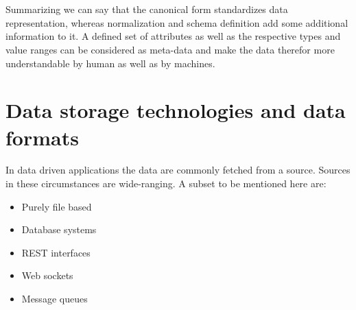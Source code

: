 \\\\
Summarizing we can say that the canonical form standardizes data representation, whereas normalization and schema definition add some additional information to it. A defined set of attributes as well as the respective types and value ranges can be considered as meta-data and make the data therefor more understandable by human as well as by machines. 

\section{Data storage technologies and data formats\label{sec:storage}}

In data driven applications the data are commonly fetched from a source. Sources in these circumstances are wide-ranging. A subset to be mentioned here are:
\begin{itemize}
  \item Purely file based
  \item Database systems
  \item REST interfaces
  \item Web sockets
  \item Message queues\\
\end{itemize}

